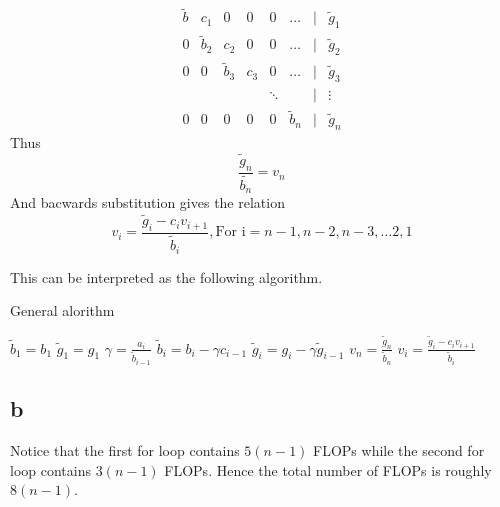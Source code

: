 \documentclass[english,notitlepage]{revtex4-1}  %
\begin{document}
        \begin{equation*}
            \begin{matrix}
            \tilde{b} & c_1 & 0 & 0 & 0 & \dots & | & \tilde{g}_1
            \\
            0 & \tilde{b}_2 & c_2 & 0 & 0 & \dots & | & \tilde{g}_2
            \\
            0 & 0 & \tilde{b}_3 & c_3 & 0 & \dots & | & \tilde{g}_3
            \\
            & & & &  \ddots&   &| & \vdots
            \\
            0 & 0 & 0 & 0 & 0 & \tilde{b}_n &|& \tilde{g}_n
            \end{matrix}
        \end{equation*}
        Thus 
        \begin{equation*}
            \frac{\tilde{g}_n}{\tilde{b_n}} = v_n
        \end{equation*}
        And bacwards substitution gives the relation 
        \begin{equation*}
            v_i = \frac{\tilde{g}_i - c_i v_{i+1}}{\tilde{b}_i}, \text{For i}  = n-1, n-2, n-3,  \dots 2, 1
        \end{equation*}

        This can be interpreted as the following algorithm.
        \begin{algorithm}[H]
            \caption{General alorithm}\label{algo:general}
            \begin{algorithmic}
                \State $\tilde{b}_1 = b_1$
                \State $\tilde{g}_1 = g_1$
                    \State $\gamma = \frac{a_i}{\tilde{b}_{i - 1}}$
                    \State $\tilde{b}_i = b_i - \gamma c_{i-1}$
                    \State $\tilde{g}_i = g_i - \gamma\tilde{g}_{i-1}$
                \EndFor
                \State $v_n = \frac{\tilde{g}_n}{\tilde{b}_n}$
                    \State $v_i = \frac{\tilde{g}_i-c_i v_{i+1}}{\tilde{b}_i}$
                \EndFor
            \end{algorithmic}
        \end{algorithm}

    \subsection*{b}
        Notice that the first for loop contains $5(n-1)$ FLOPs while the second for loop contains $3(n-1)$ FLOPs.
        Hence the total number of FLOPs is roughly $8(n-1)$.
\end{document}
